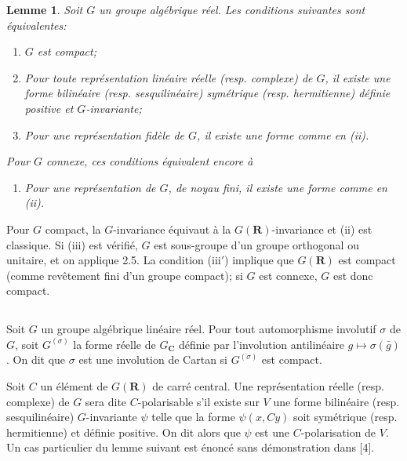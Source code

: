 \documentclass[11pt]{amsart}
\theoremstyle{plain}
\newtheorem{lemme}[theoreme]{Lemme}
\theoremstyle{definition}
\theoremstyle{remark}
\begin{document}
\begin{lemme}
Soit $G$ un groupe alg\'ebrique r\'eel. Les conditions suivantes sont \'equivalentes:
\begin{enumerate}
\item[(i)] $G$ est compact;
\item[(ii)] Pour toute repr\'esentation lin\'eaire r\'eelle \textup{(}resp. complexe\textup{)} de $G$, il existe une forme bilin\'eaire \textup{(}resp. sesquilin\'eaire\textup{)} sym\'etrique \textup{(}resp. hermitienne\textup{)} d\'efinie positive et $G$-invariante;
\item[(iii)] Pour une repr\'esentation fid\`ele de $G$, il existe une forme comme en \textup{(ii)}.
\end{enumerate}
Pour $G$ connexe, ces conditions \'equivalent encore \`a
\begin{enumerate}
\item[(iii$'$)] Pour une repr\'esentation de $G$, de noyau fini, il existe une forme comme en \textup{(ii)}.
\end{enumerate}
\end{lemme}

Pour $G$ compact, la $G$-invariance \'equivaut \`a la $G(\mathbf{R})$-invariance et (ii) est classique. Si (iii) est v\'erifi\'e, $G$ est sous-groupe d'un groupe orthogonal ou unitaire, et on applique 2.5. La condition (iii$'$) implique que $G(\mathbf{R})$ est compact (comme rev\^etement fini d'un groupe compact); si $G$ est connexe, $G$ est donc compact.

\subsection*{}
Soit $G$ un groupe alg\'ebrique lin\'eaire r\'eel. Pour tout automorphisme involutif $\sigma$ de $G$, soit $G^{(\sigma)}$ la forme r\'eelle de $G_\mathbf{C}$ d\'efinie par l'involution antilin\'eaire $g\mapsto\sigma(\bar{g})$. On dit que $\sigma$ est une involution de Cartan si $G^{(\sigma)}$ est compact.

Soit $C$ un \'el\'ement de $G(\mathbf{R})$ de carr\'e central. Une repr\'esentation r\'eelle (resp. complexe) de $G$ sera dite $C$-polarisable s'il existe sur $V$ une forme bilin\'eaire (resp. sesquilin\'eaire) $G$-invariante $\psi$ telle que la forme $\psi(x,Cy)$ soit sym\'etrique (resp. hermitienne) et d\'efinie positive. On dit alors que $\psi$ est une $C$-polarisation de $V$. Un cas particulier du lemme suivant est \'enonc\'e sans d\'emonstration dans [4].
\end{document}
